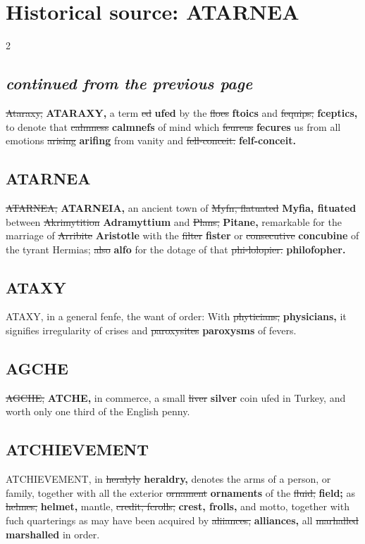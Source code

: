 \documentclass[10pt]{article}
\begin{document}
\section*{Historical source: ATARNEA}
\begin{multicols}{2}
\subsection*{\textit{continued from the previous page}}
\sout{Ataraxy,} \textbf{ATARAXY,} a term \sout{ed} \textbf{ufed} by the \sout{floes} \textbf{ftoics} and \sout{fequips,} \textbf{fceptics,} to denote that \sout{calmness} \textbf{calmnefs} of mind which \sout{feureus} \textbf{fecures} us from all emotions \sout{arising} \textbf{arifing} from vanity and \sout{fell-conceit.} \textbf{felf-conceit.}

\subsection*{ATARNEA}
\sout{ATARNEA,} \textbf{ATARNEIA,} an ancient town of \sout{Myfn, flatuated} \textbf{Myfia, fituated} between \sout{Akrimytition} \textbf{Adramyttium} and \sout{Plans,} \textbf{Pitane,} remarkable for the marriage of \sout{Arribite} \textbf{Aristotle} with the \sout{filter} \textbf{fister} or \sout{consecutive} \textbf{concubine} of the tyrant Hermias; \sout{also} \textbf{alfo} for the dotage of that \sout{phi-lolopier.} \textbf{philofopher.}

\subsection*{ATAXY}
ATAXY, in a general fenfe, the want of order: With \sout{phyticians,} \textbf{physicians,} it signifies irregularity of crises and \sout{paroxysites} \textbf{paroxysms} of fevers.

\subsection*{AGCHE}
\sout{AGCHE,} \textbf{ATCHE,} in commerce, a small \sout{liver} \textbf{silver} coin ufed in Turkey, and worth only one third of the English penny.

\subsection*{ATCHIEVEMENT}
ATCHIEVEMENT, in \sout{heralyly} \textbf{heraldry,} denotes the arms of a person, or family, together with all the exterior \sout{ornament} \textbf{ornaments} of the \sout{fluid;} \textbf{field;} as \sout{helmes,} \textbf{helmet,} mantle, \sout{credit, fcrolls,} \textbf{crest, frolls,} and motto, together with fuch quarterings as may have been acquired by \sout{aliiances,} \textbf{alliances,} all \sout{marhalled} \textbf{marshalled} in order.


\end{multicols}
\end{document}
